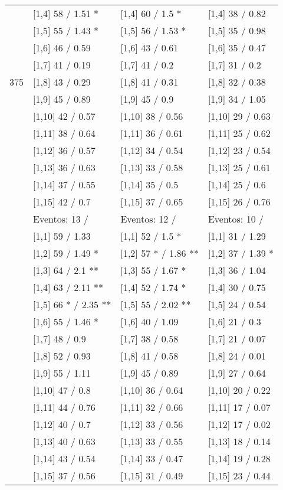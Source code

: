 \begin{table}
\begin{tabular}[t]{llll}
 & {}[1,4] 58  / 1.51 * & {}[1,4] 60  / 1.5 * & {}[1,4] 38  / 0.82\\
 & {}[1,5] 55  / 1.43 * & {}[1,5] 56  / 1.53 * & {}[1,5] 35  / 0.98\\
 & {}[1,6] 46  / 0.59 & {}[1,6] 43  / 0.61 & {}[1,6] 35  / 0.47\\
 & {}[1,7] 41  / 0.19 & {}[1,7] 41  / 0.2 & {}[1,7] 31  / 0.2\\
375 & {}[1,8] 43  / 0.29 & {}[1,8] 41  / 0.31 & {}[1,8] 32  / 0.38\\
\addlinespace
 & {}[1,9] 45  / 0.89 & {}[1,9] 45  / 0.9 & {}[1,9] 34  / 1.05\\
 & {}[1,10] 42  / 0.57 & {}[1,10] 38  / 0.56 & {}[1,10] 29  / 0.63\\
 & {}[1,11] 38  / 0.64 & {}[1,11] 36  / 0.61 & {}[1,11] 25  / 0.62\\
 & {}[1,12] 36  / 0.57 & {}[1,12] 34  / 0.54 & {}[1,12] 23  / 0.54\\
 & {}[1,13] 36  / 0.63 & {}[1,13] 33  / 0.58 & {}[1,13] 25  / 0.61\\
\addlinespace
 & {}[1,14] 37  / 0.55 & {}[1,14] 35  / 0.5 & {}[1,14] 25  / 0.6\\
 & {}[1,15] 42  / 0.7 & {}[1,15] 37  / 0.65 & {}[1,15] 26  / 0.76\\
 & Eventos:  13 / & Eventos:  12 / & Eventos:  10 /\\
 & {}[1,1] 59  / 1.33 & {}[1,1] 52  / 1.5 * & {}[1,1] 31  / 1.29\\
 & {}[1,2] 59  / 1.49 * & {}[1,2] 57 * / 1.86 ** & {}[1,2] 37  / 1.39 *\\
\addlinespace
 & {}[1,3] 64  / 2.1 ** & {}[1,3] 55  / 1.67 * & {}[1,3] 36  / 1.04\\
 & {}[1,4] 63  / 2.11 ** & {}[1,4] 52  / 1.74 * & {}[1,4] 30  / 0.75\\
 & {}[1,5] 66 * / 2.35 ** & {}[1,5] 55  / 2.02 ** & {}[1,5] 24  / 0.54\\
 & {}[1,6] 55  / 1.46 * & {}[1,6] 40  / 1.09 & {}[1,6] 21  / 0.3\\
 & {}[1,7] 48  / 0.9 & {}[1,7] 38  / 0.58 & {}[1,7] 21  / 0.07\\
\addlinespace
500 & {}[1,8] 52  / 0.93 & {}[1,8] 41  / 0.58 & {}[1,8] 24  / 0.01\\
 & {}[1,9] 55  / 1.11 & {}[1,9] 45  / 0.89 & {}[1,9] 27  / 0.64\\
 & {}[1,10] 47  / 0.8 & {}[1,10] 36  / 0.64 & {}[1,10] 20  / 0.22\\
 & {}[1,11] 44  / 0.76 & {}[1,11] 32  / 0.66 & {}[1,11] 17  / 0.07\\
 & {}[1,12] 40  / 0.7 & {}[1,12] 33  / 0.56 & {}[1,12] 17  / 0.02\\
\addlinespace
 & {}[1,13] 40  / 0.63 & {}[1,13] 33  / 0.55 & {}[1,13] 18  / 0.14\\
 & {}[1,14] 43  / 0.54 & {}[1,14] 33  / 0.47 & {}[1,14] 19  / 0.28\\
 & {}[1,15] 37  / 0.56 & {}[1,15] 31  / 0.49 & {}[1,15] 23  / 0.44\\
\bottomrule
\end{tabular}
\end{table}
